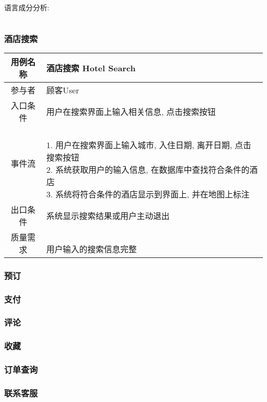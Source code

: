 \documentclass[11pt]{article}
\begin{document}
			语言成分分析: 
			\begin{tabular}{|c|c|c|}\hline
			\end{tabular}
			
			
						
		\subsubsection{酒店搜索}
			\begin{tabular}{c|l}
			\hline
			用例名称 & 酒店搜索 Hotel Search \\ \hline
			参与者 & 顾客User  \\ \hline
			入口条件 & 用户在搜索界面上输入相关信息, 点击搜索按钮 \\ \hline
			事件流 & 	\parbox{33em}{\ \\
						1. 用户在搜索界面上输入城市, 入住日期,  离开日期, 点击搜索按钮 \\
						2. 系统获取用户的输入信息, 在数据库中查找符合条件的酒店 \\
						3. 系统将符合条件的酒店显示到界面上, 并在地图上标注  \\
						} \\ \hline
			出口条件 & 系统显示搜索结果或用户主动退出 \\ \hline
			质量需求 & \parbox{33em}{\ \\
						用户输入的搜索信息完整 \\
						} \\ \hline
			\end{tabular}

		\subsubsection{预订}
		\subsubsection{支付}
		\subsubsection{评论}
		\subsubsection{收藏}
		\subsubsection{订单查询}
		\subsubsection{联系客服}
	
	
	
\end{document}
